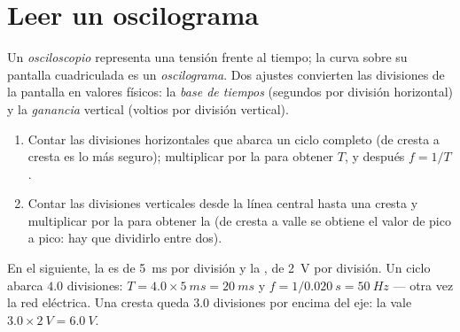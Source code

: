 \section{Leer un oscilograma}

\begin{definition}[Osciloscopio]\label{def:g10:signals-and-waves:oscilloscope}
Un \emph{osciloscopio} representa una tensión frente
al tiempo; la curva sobre su pantalla cuadriculada es un
\emph{oscilograma}. Dos ajustes convierten las
divisiones de la pantalla en valores físicos: la \emph{base de
tiempos} (segundos por división horizontal) y la
\emph{ganancia} vertical (voltios por división
vertical).
\end{definition}

\begin{method}\label{met:g10:signals-and-waves:oscillogram}
\begin{enumerate}
  \item Contar las divisiones horizontales que abarca un ciclo completo
        (de cresta a cresta es lo más seguro); multiplicar por la  para obtener $T$, y después $f = 1/T$.
  \item Contar las divisiones verticales desde la línea central hasta
        una cresta y multiplicar por la  para obtener la
         (de cresta a valle se obtiene el valor de pico a pico:
        hay que dividirlo entre dos).
\end{enumerate}
\end{method}

\begin{example}\label{ex:g10:signals-and-waves:reading}
En el  siguiente, la  es de \qty{5}{ms} por
división y la , de \qty{2}{V} por división. Un ciclo abarca
$4.0$ divisiones: $T = 4.0 \times \qty{5}{ms} = \qty{20}{ms}$ y
$f = 1/\qty{0.020}{s} = \qty{50}{Hz}$ --- otra vez la red eléctrica. Una
cresta queda $3.0$ divisiones por encima del eje: la  vale
$3.0 \times \qty{2}{V} = \qty{6.0}{V}$.
\end{example}

